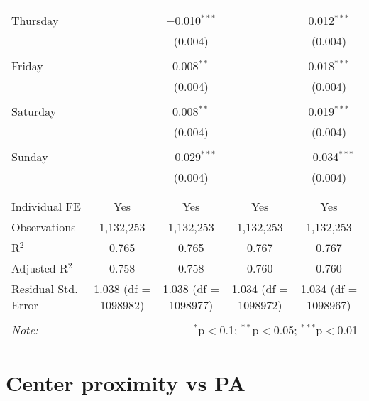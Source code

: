 \documentclass[
]{article}
\begin{document}
\begin{table}[!htbp]
{\begin{tabular}{@{\extracolsep{5pt}}lcccc}
  & & & & \\ 
 Thursday &  & $-$0.010$^{***}$ &  & 0.012$^{***}$ \\ 
  &  & (0.004) &  & (0.004) \\ 
  & & & & \\ 
 Friday &  & 0.008$^{**}$ &  & 0.018$^{***}$ \\ 
  &  & (0.004) &  & (0.004) \\ 
  & & & & \\ 
 Saturday &  & 0.008$^{**}$ &  & 0.019$^{***}$ \\ 
  &  & (0.004) &  & (0.004) \\ 
  & & & & \\ 
 Sunday &  & $-$0.029$^{***}$ &  & $-$0.034$^{***}$ \\ 
  &  & (0.004) &  & (0.004) \\ 
  & & & & \\ 
\hline \\[-1.8ex] 
Individual FE & Yes & Yes & Yes & Yes \\ 
Observations & 1,132,253 & 1,132,253 & 1,132,253 & 1,132,253 \\ 
R$^{2}$ & 0.765 & 0.765 & 0.767 & 0.767 \\ 
Adjusted R$^{2}$ & 0.758 & 0.758 & 0.760 & 0.760 \\ 
Residual Std. Error & 1.038 (df = 1098982) & 1.038 (df = 1098977) & 1.034 (df = 1098972) & 1.034 (df = 1098967) \\ 
\hline 
\hline \\[-1.8ex] 
\textit{Note:}  & \multicolumn{4}{r}{$^{*}$p$<$0.1; $^{**}$p$<$0.05; $^{***}$p$<$0.01} \\ 
\end{tabular}
} 
\end{table} 
\newpage
\section{Center proximity vs PA}
\end{document}
